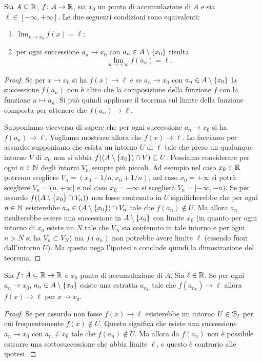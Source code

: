 \begin{theorem}%
\label{th:ponte}%
\mymark{***}%
Sia $A \subseteq {\mathbb R}$, $f\colon A \to {\mathbb R}$, sia $x_0$ un punto di accumulazione di $A$ e sia
$\ell \in [-\infty, +\infty]$.
Le due seguenti condizioni sono equivalenti:
\begin{enumerate}
\item $\displaystyle \lim_{x\to x_0} f(x) = \ell$;
\item per ogni successione $a_n\to x_0$ con $a_n\in A\setminus{\left\{ x_0 \right\}}$ risulta
\[
\lim_{n\to+\infty} f(a_n) = \ell. 
\]
\end{enumerate}
\end{theorem}
%
\begin{proof}
\mymark{***}
Se per $x\to x_0$ si ha $f(x)\to \ell$ e se $a_n \to x_0$ con $a_n\in A\setminus{\left\{ x_0 \right\}}$ la successione $f(a_n)$ non è altro che la composizione
della funzione $f$ con la funzione $n\mapsto a_n$. Si può quindi applicare
il teorema sul limite della funzione composta per ottenere che $f(a_n)\to \ell$.

Supponiamo viceversa di sapere che per ogni successione $a_n\to x_0$ si ha $f(a_n)\to \ell$. Vogliamo mostrare allora che $f(x)\to \ell$. Lo facciamo per assurdo: supponiamo che esista un intorno $U$ di $\ell$ tale che preso un qualunque intorno $V$ di $x_0$ non si abbia $f((A\setminus{\left\{ x_0 \right\}})\cap V)\subseteq U$.
Possiamo considerare per ogni $n\in {\mathbb N}$ degli intorni $V_n$ sempre più piccoli. Ad esempio nel caso $x_0 \in {\mathbb R}$ potremo scegliere $V_n = (x_0-1/n, x_0+1/n)$, nel caso $x_0 = +\infty$ si potrà scegliere $V_n = (n,+\infty]$ e nel caso $x_0=-\infty$ si sceglierà $V_n = [-\infty, -n)$.
Se per assurdo $f((A\setminus{\left\{ x_0 \right\}}\cap V_n))$ non fosse contenuto in $U$
significherebbe che per ogni $n\in{\mathbb N}$ esisterebbe $a_n \in (A\setminus{\left\{ x_0 \right\}})\cap V_n$ tale che $f(a_n)\not \in U$. Ma allora $a_n$ risulterebbe essere una successione in
$A\setminus {\left\{ x_0 \right\}}$ con limite $x_0$
(in quanto per ogni intorno di $x_0$ esiste un $N$ tale che $V_N$ sia contenuto in tale intorno e per ogni $n>N$ si ha $V_n\subset V_N$)
ma $f(a_n)$ non potrebbe avere limite $\ell$
(essendo fuori dall'intorno $U$).
Ma questo nega l'ipotesi e conclude quindi la dimostrazione del teorema.
\end{proof}
\begin{proposition}
  \label{prop:convergenza}
Sia $f\colon A\subseteq {\mathbb R}\to {\mathbb R}$ e $x_0$ punto di accumulazione di $A$.
Sia $\ell\in \bar {{\mathbb R}}$.
Se per ogni $a_n\to x_0$, $a_n\in A\setminus{\left\{ x_0 \right\}}$
esiste una estratta $a_{n_k}$ tale che $f(a_{n_k})\to \ell$ 
allora $f(x)\to \ell$ per $x\to x_0$.
\end{proposition}
%
\begin{proof}
  Se per assurdo non fosse $f(x) \to \ell$
  esisterebbe un intorno $U\in \mathcal B_\ell$
  per cui frequentemente $f(x) \not \in U$.
  Questo significa che esiste una successione
  $a_n\to x_0$ con $a_n\neq x_0$ tale che $f(a_n)\not \in U$.
  Ma allora da $f(a_n)$
  non è possibile estrarre una sottosuccessione
  che abbia limite $\ell$, e questo è contrario alle
  ipotesi.
\end{proof}

